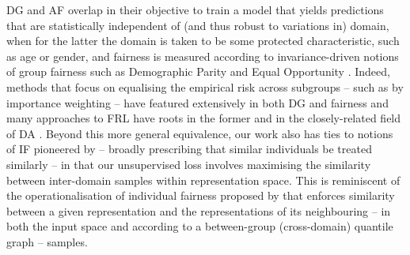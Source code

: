 \ac{DG} and \ac{AF} overlap in their objective to train a model that yields predictions that are
statistically independent of (and thus robust to variations in) domain, when for the latter the
domain is taken to be some protected characteristic, such as age or gender, and fairness is
measured according to invariance-driven notions of group fairness such as Demographic Parity
\citep{feldman2015certifying} and Equal Opportunity \citep{hardt2016equality}. 
%
Indeed, methods that focus on equalising the empirical risk across subgroups -- such as by
importance weighting \citep{idrissi2022simple, shimodaira2000improving} -- have featured
extensively in both \ac{DG}
\citep{arjovsky2019invariant,creager2021environment,krueger2021out,sagawa2019distributionally} and
fairness \citep{agarwal2018reductions,donini2018empirical,kamiran2012data} and many approaches to
\ac{FRL} \citep{creager2019flexibly,kehrenberg2020null,madras2018learning,
oneto2020exploiting,quadrianto2019discovering} have roots in the former \cite{muandet2013domain}
and in the closely-related field of \ac{DA} \citep{ganin2016domain}. 
%
Beyond this more general equivalence, our work also has ties to notions of \ac{IF} pioneered by
\cite{dwork2012fairness} -- broadly prescribing that similar individuals be treated similarly -- in
that our unsupervised loss involves maximising the similarity between inter-domain samples within
representation space. 
%
This is reminiscent of the operationalisation of individual fairness proposed by
\cite{lahoti2019operationalizing} that enforces similarity between a given representation and the
representations of its neighbouring -- in both the input space and according to a between-group
(cross-domain) quantile graph -- samples.
